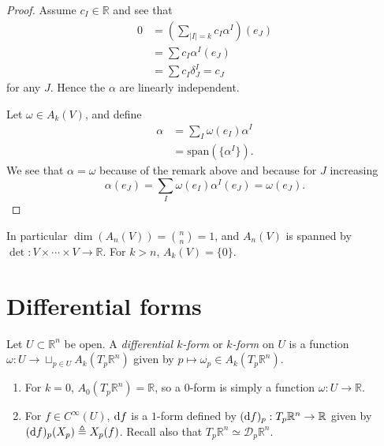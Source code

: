 \begin{proof}
Assume $c_I \in \mathbb{R}$ and see that
\begin{align*}
   0
&= \left(\sum_{|I|=k} c_I \alpha^I\right)(e_J) \\
&= \sum c_I \alpha^I(e_J) \\
&= \sum c_I \delta^I_J = c_J
\end{align*}
for any $J$. Hence the $\alpha$ are linearly independent.

Let $\omega \in A_k(V)$, and define
\begin{align*}
   \alpha
&= \sum_I \omega(e_I) \alpha^I \\
&= \mathrm{span}(\{ \alpha^I \}).
\end{align*}
We see that $\alpha = \omega$ because of the remark above and because
for $J$ increasing
$$
  \alpha(e_J)
= \sum_I \omega(e_I) \alpha^I(e_J)
= \omega(e_J).
$$
\end{proof}

In particular $\dim(A_n(V)) = {n \choose n} = 1$, and $A_n(V)$ is
spanned by $\det: V \times \cdots \times V \to \mathbb{R}$.
For $k > n$, $A_k(V) = \{ 0 \}$.

\section*{Differential forms}

\begin{defn}
Let $U \subset \mathbb{R}^n$ be open. A \emph{differential $k$-form}
or \emph{$k$-form} on $U$ is a function
$\omega : U \to \sqcup_{p \in U} A_k(T_p \mathbb{R}^n)$ given by
$p \mapsto \omega_p \in A_k(T_p \mathbb{R}^n)$.
\end{defn}

\begin{xmpl}
  \begin{enumerate}
    \item{
       For $k = 0$,
       $A_0(T_p \mathbb{R}^n) = \mathbb{R}$, so a $0$-form is simply a
       function $\omega: U \to \mathbb{R}$.
    }
    \item{
      For $f \in C^\infty(U)$, $\mathop{}\!\mathrm{d} f$ is a $1$-form defined by
      $(\mathop{}\!\mathrm{d} f)_p : T_p \mathbb{R}^n \to \mathbb{R}$ given by
      $(\mathop{}\!\mathrm{d} f)_p (X_p) \triangleq X_p(f)$. Recall also that
      $T_p \mathbb{R}^n \simeq \mathcal{D}_p \mathbb{R}^n$.
    }
  \end{enumerate}
\end{xmpl}

